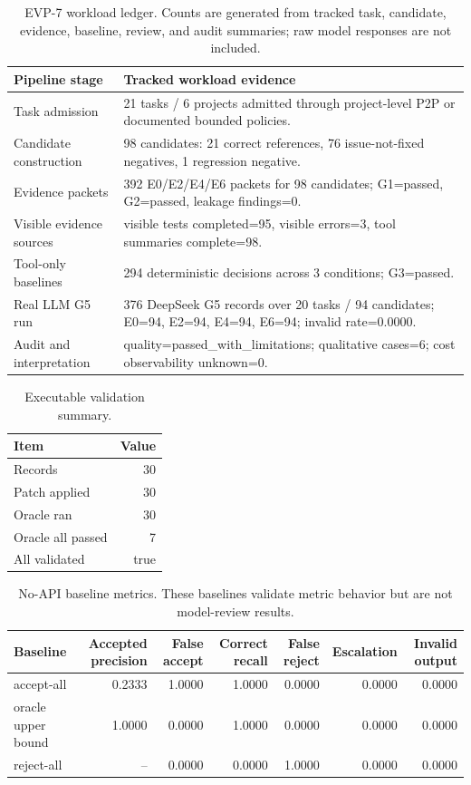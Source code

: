 \documentclass[conference]{IEEEtran}
\begin{document}
\begin{table}[t]
\centering
\caption{EVP-7 workload ledger. Counts are generated from tracked task, candidate, evidence, baseline, review, and audit summaries; raw model responses are not included.}
\label{tab:evp7-workload-ledger}
\begin{tabular}{p{}p{}}
\toprule
Pipeline stage & Tracked workload evidence \\
\midrule
Task admission & 21 tasks / 6 projects admitted through project-level P2P or documented bounded policies. \\
Candidate construction & 98 candidates: 21 correct references, 76 issue-not-fixed negatives, 1 regression negative. \\
Evidence packets & 392 E0/E2/E4/E6 packets for 98 candidates; G1=passed, G2=passed, leakage findings=0. \\
Visible evidence sources & visible tests completed=95, visible errors=3, tool summaries complete=98. \\
Tool-only baselines & 294 deterministic decisions across 3 conditions; G3=passed. \\
Real LLM G5 run & 376 DeepSeek G5 records over 20 tasks / 94 candidates; E0=94, E2=94, E4=94, E6=94; invalid rate=0.0000. \\
Audit and interpretation & quality=passed\_with\_limitations; qualitative cases=6; cost observability unknown=0. \\
\bottomrule
\end{tabular}
\end{table}


\begin{table}[t]
\centering
\caption{Executable validation summary.}
\label{tab:validation-summary}
\begin{tabular}{lr}
\toprule
Item & Value \\
\midrule
Records & 30 \\
Patch applied & 30 \\
Oracle ran & 30 \\
Oracle all passed & 7 \\
All validated & true \\
\bottomrule
\end{tabular}
\end{table}


\begin{table}[t]
\centering
\caption{No-API baseline metrics. These baselines validate metric behavior but are not model-review results.}
\label{tab:no-api-baselines}
\begin{tabular}{lrrrrrr}
\toprule
Baseline & Accepted precision & False accept & Correct recall & False reject & Escalation & Invalid output \\
\midrule
accept-all & 0.2333 & 1.0000 & 1.0000 & 0.0000 & 0.0000 & 0.0000 \\
oracle upper bound & 1.0000 & 0.0000 & 1.0000 & 0.0000 & 0.0000 & 0.0000 \\
reject-all & -- & 0.0000 & 0.0000 & 1.0000 & 0.0000 & 0.0000 \\
\bottomrule
\end{tabular}
\end{table}
\end{document}
